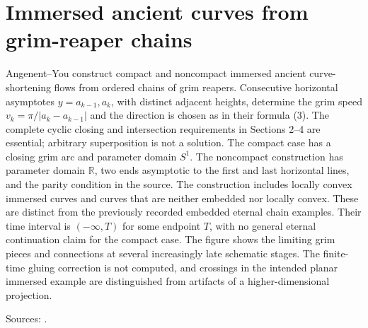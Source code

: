 \chapter{Immersed ancient curves from grim-reaper chains}\label{sec:catalogue-immersed-ancient-grim-chains}
\begin{example}\label{ex:catalogue-immersed-ancient-grim-chains}
Angenent--You construct compact and noncompact immersed ancient curve-shortening flows from ordered chains of grim reapers. Consecutive horizontal asymptotes $y=a_{k-1},a_k$, with distinct adjacent heights, determine the grim speed $v_k=\pi/|a_k-a_{k-1}|$ and the direction is chosen as in their formula (3). The complete cyclic closing and intersection requirements in Sections 2–4 are essential; arbitrary superposition is not a solution.
The compact case has a closing grim arc and parameter domain $S^1$. The noncompact construction has parameter domain $\mathbb R$, two ends asymptotic to the first and last horizontal lines, and the parity condition in the source. The construction includes locally convex immersed curves and curves that are neither embedded nor locally convex. These are distinct from the previously recorded embedded eternal chain examples. Their time interval is $(-\infty,T)$ for some endpoint $T$, with no general eternal continuation claim for the compact case. The figure shows the limiting grim pieces and connections at several increasingly late schematic stages. The finite-time gluing correction is not computed, and crossings in the intended planar immersed example are distinguished from artifacts of a higher-dimensional projection.
\par Sources: \cite{CatAY18}.
\end{example}

